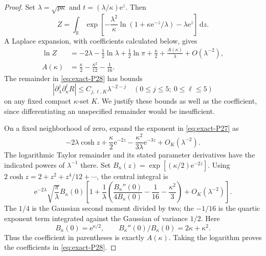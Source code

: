 \begin{proof} Set \(\lambda=\sqrt{p\kappa}\) and
\(t=(\lambda/\kappa)\mathrm{e}^z\). Then
\begin{equation}
 Z=\int_{\mathbb R}
 \exp\left[-\frac{\lambda^2}{\kappa}
                  \ln(1+\kappa \mathrm{e}^{-z}/\lambda)-\lambda \mathrm{e}^z\right]\,\mathrm{d}z.
                                                               \label{eq:exact-P27}
\end{equation}
A Laplace expansion, with coefficients calculated below, gives
\begin{equation}
\begin{split}
 \ln Z
 &=-2\lambda-\tfrac12\ln\lambda+\tfrac12\ln\pi
  +\frac\kappa2+\frac{A(\kappa)}{\lambda}
  +O(\lambda^{-2}),\\
 A(\kappa)&=\frac\kappa2-\frac{\kappa^2}{12}-\frac1{16}.
\end{split}
                                                               \label{eq:exact-P28}
\end{equation}
The remainder in \eqref{eq:exact-P28} has bounds
\begin{equation}
 |\partial_\lambda^j\partial_\kappa^\ell R|
 \le C_{j,\ell,K}\lambda^{-2-j}
 \quad(0\le j\le5;\ 0\le\ell\le5)
                                                               \label{eq:exact-P29}
\end{equation}
on any fixed compact \(\kappa\)-set \(K\). We justify these bounds as well as the coefficient, since differentiating an unspecified remainder would be insufficient.

On a fixed neighborhood of zero, expand the exponent in \eqref{eq:exact-P27} as
\begin{equation}
 -2\lambda\cosh z+\frac\kappa2 \mathrm{e}^{-2z}
             -\frac{\kappa^2}{3\lambda}\mathrm{e}^{-3z}
             +O_K(\lambda^{-2}).
\end{equation}
The logarithmic Taylor remainder and its stated parameter derivatives have the indicated powers of \(\lambda^{-1}\) there. Set
\(B_\kappa(z)=\exp[(\kappa/2)\mathrm{e}^{-2z}]\).
Using \(2\cosh z=2+z^2+z^4/12+\cdots\), the central integral is
\begin{equation}
 \mathrm{e}^{-2\lambda}\sqrt{\frac{\pi}{\lambda}} B_\kappa(0)
 \left[1+\frac1\lambda
  \left(\frac{B_\kappa''(0)}{4B_\kappa(0)}
            -\frac1{16}-\frac{\kappa^2}{3}\right)
       +O_K(\lambda^{-2})\right].                    \label{eq:exact-P30}
\end{equation}
The \(1/4\) is the Gaussian second moment divided by two; the \(-1/16\) is the quartic exponent term integrated against the Gaussian of variance \(1/2\).
Here
\begin{equation}
 B_\kappa(0)=\mathrm{e}^{\kappa/2},\qquad
 B_\kappa''(0)/B_\kappa(0)=2\kappa+\kappa^2.
\end{equation}
Thus the coefficient in parentheses is exactly \(A(\kappa)\).
Taking the logarithm proves the coefficients in \eqref{eq:exact-P28}.


\end{proof}
